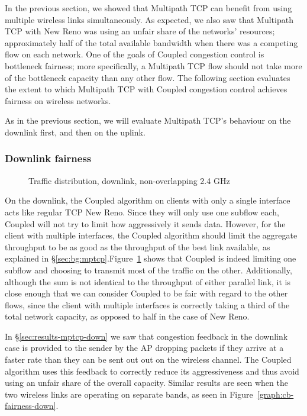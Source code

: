 In the previous section, we showed that Multipath TCP can benefit from
using multiple wireless links simultaneously. As expected, we also saw that
Multipath TCP with New Reno was using an unfair share of the networks'
resources; approximately half of the total available bandwidth when there was a
competing flow on each network. One of the goals of Coupled congestion 
control is bottleneck fairness; more specifically, a 
Multipath TCP flow should not take more of the bottleneck capacity than any 
other flow. The following section evaluates the extent to which Multipath TCP with 
Coupled congestion control achieves fairness on wireless networks.

As in the previous section, we will evaluate Multipath TCP's behaviour on the
downlink first, and then on the uplink.

\subsubsection{Downlink fairness}

\begin{figure}[h]
 \centering
 
 \caption{Traffic distribution, downlink, non-overlapping 2.4 GHz}\label{graph:down-fair}
\end{figure}

On the downlink, the Coupled algorithm on clients with only a single
interface acts like regular TCP New Reno. Since they will only use one subflow
each, Coupled will not try to limit how aggressively it sends data. However, for
the client with multiple interfaces, the Coupled algorithm should limit the
aggregate throughput to be as good as the throughput of the best link
available, as explained in \S\ref{sec:bg:mptcp}.\@ Figure~\ref{graph:down-fair}
shows that Coupled is indeed limiting one subflow and choosing to transmit most
of the traffic on the other.  Additionally, although the sum is not identical to
the throughput of either parallel link, it is close enough that we can consider
Coupled to be fair with regard to the other flows, since the
client with multiple interfaces is correctly taking a third of the total network
capacity, as opposed to half in the case of New Reno.


In \S\ref{sec:results-mptcp-down} we saw that congestion feedback in the 
downlink case is provided to the sender by the AP dropping packets if they
arrive at a faster rate than they can be sent out out on the wireless channel. The
Coupled algorithm uses this feedback to correctly reduce its aggressiveness and 
thus avoid using an unfair share of the overall capacity.
Similar results are seen when the two wireless links are operating on separate
bands, as seen in Figure~\ref{graph:cb-fairness-down}.

